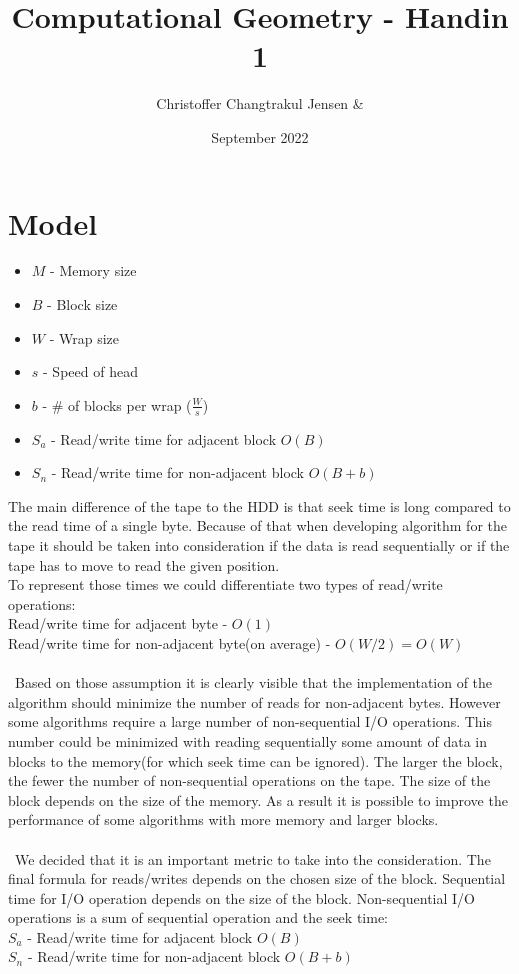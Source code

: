 \documentclass{article}
\title{Computational Geometry - Handin 1}
\author{Christoffer Changtrakul Jensen \& }
\date{September 2022}
\begin{document}
\maketitle

\section*{Model}
\begin{itemize}
    \item $M$ - Memory size
    \item $B$ - Block size
    \item $W$ - Wrap size
    \item $s$ - Speed of head
    \item $b$ - \# of blocks per wrap ($\frac{W}{s}$)
    \item $S_a$ - Read/write time for adjacent block $O(B)$
    \item $S_n$ - Read/write time for non-adjacent block $O(B + b)$
    \end{itemize}

The main difference of the tape to the HDD is that seek time is long compared to the read time of a single byte. Because of that when developing algorithm for the tape it should be taken into consideration if the data is read sequentially or if the tape has to move to read the given position. \\
To represent those times we could differentiate two types of read/write operations: \\
\indent Read/write time for adjacent byte - $O(1)$ \\
\indent Read/write time for non-adjacent byte(on average) - $O(W/2) = O(W)$\\\\
\
Based on those assumption it is clearly visible that the implementation of the algorithm should minimize the number of reads for non-adjacent bytes. However some algorithms require a large number of non-sequential I/O operations. This number could be minimized with reading sequentially some amount of data in blocks to the memory(for which seek time can be ignored). The larger the block, the fewer the number of non-sequential operations on the tape. The size of the block depends on the size of the memory. As a result it is possible to improve the performance of some algorithms with more memory and larger blocks.\\\\
\
We decided that it is an important metric to take into the consideration. The final formula for reads/writes depends on the chosen size of the block. Sequential time for I/O operation depends on the size of the block. Non-sequential I/O operations is a sum of sequential operation and the seek time:\\
\indent $S_a$ - Read/write time for adjacent block $O(B)$\\
\indent $S_n$ - Read/write time for non-adjacent block $O(B + b)$\\
\end{document}

